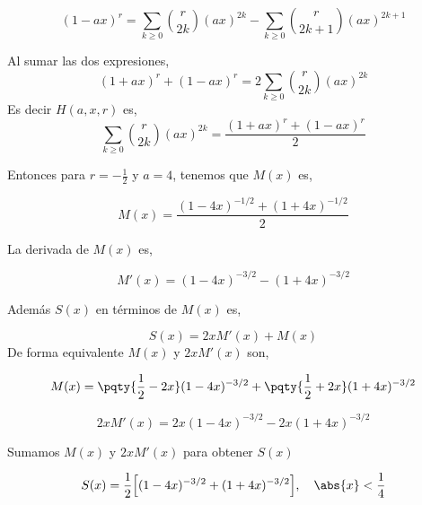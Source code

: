 {\[
	(1-ax)^r
	=\sum_{k\ge0}\binom{r}{2k}(ax)^{2k}-\sum_{k\ge0}\binom{r}{2k+1}(ax)^{2k+1}
\]

Al sumar las dos expresiones,
\[
	(1+ax)^r+(1-ax)^r=2\sum_{k\ge0}\binom{r}{2k}(ax)^{2k}
\]
Es decir $ H(a,x,r)$ es,
\[
	\sum_{k\ge0}\binom{r}{2k}(ax)^{2k}=\frac{(1+ax)^r+(1-ax)^r}{2}
\]


Entonces para $r=-\frac{1}{2}$ y $a=4$, tenemos que $M(x)$ es,

\newpage

$$
	M(x)=\frac{ (1-4x)^{-1/2}+(1+4x)^{-1/2}}{2}
$$

La derivada de $M(x)$ es,

$$
	M'(x)=(1-4x)^{-3/2}-(1+4x)^{-3/2}
$$

Además $S(x)$ en términos de $M(x)$ es,

$$
	S(x)=2x  M'(x) +M(x)
$$
De forma equivalente $M(x)$ y $2xM'(x)$ son,

$$
	M(x)=   \pqty{\frac{1}{2}-2x}(1-4x)^{-3/2}+\pqty{\frac{1}{2}+2x}(1+4x)^{-3/2}
$$

$$
	2xM'(x)=  2x(1-4x)^{-3/2}-2x(1+4x)^{-3/2}
$$

Sumamos $M(x)$ y $2xM'(x)$ para obtener $S(x)$


}
\begin{LnxRptaBox}
	$$
		S(x)=\frac{1}{2}\Bigl[(1-4x)^{-3/2}+(1+4x)^{-3/2}\Bigr],\quad  \abs{x}<\frac{1}{4}
	$$
\end{LnxRptaBox}

